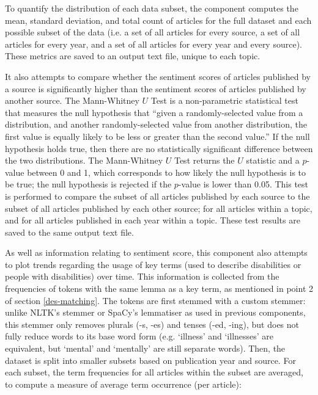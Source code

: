 \documentclass{report}
\begin{document}
To quantify the distribution of each data subset, the component computes the mean, standard deviation, and total count of articles for the full dataset and each possible subset of the data (i.e. a set of all articles for every source, a set of all articles for every year, and a set of all articles for every year and every source). 
These metrics are saved to an output text file, unique to each topic.

It also attempts to compare whether the sentiment scores of articles published by a source is significantly higher than the sentiment scores of articles published by another source. 
The Mann-Whitney $U$ Test \cite{mann1947test} is a non-parametric statistical test that measures the null hypothesis that ``given a randomly-selected value from a distribution, and another randomly-selected value from another distribution, the first value is equally likely to be less or greater than the second value.''
If the null hypothesis holds true, then there are no statistically significant difference between the two distributions.
The Mann-Whitney $U$ Test returns the $U$ statistic and a $p$-value between 0 and 1, which corresponds to how likely the null hypothesis is to be true; the null hypothesis is rejected if the $p$-value is lower than 0.05.
This test is performed to compare the subset of all articles published by each source to the subset of all articles published by each other source; for all articles within a topic, and for all articles published in each year within a topic.
These test results are saved to the same output text file.

As well as information relating to sentiment score, this component also attempts to plot trends regarding the usage of key terms (used to describe disabilities or people with disabilities) over time.
This information is collected from the frequencies of tokens with the same lemma as a key term, as mentioned in point 2 of section \ref{des-matching}.
The tokens are first stemmed with a custom stemmer: unlike NLTK's stemmer or SpaCy's lemmatiser as used in previous components, this stemmer only removes plurals (-s, -es) and tenses (-ed, -ing), but does not fully reduce words to its base word form (e.g. `illness' and `illnesses' are equivalent, but `mental' and `mentally' are still separate words).
Then, the dataset is split into smaller subsets based on publication year and source.
For each subset, the term frequencies for all articles within the subset are averaged, to compute a measure of average term occurrence (per article):
\end{document}
